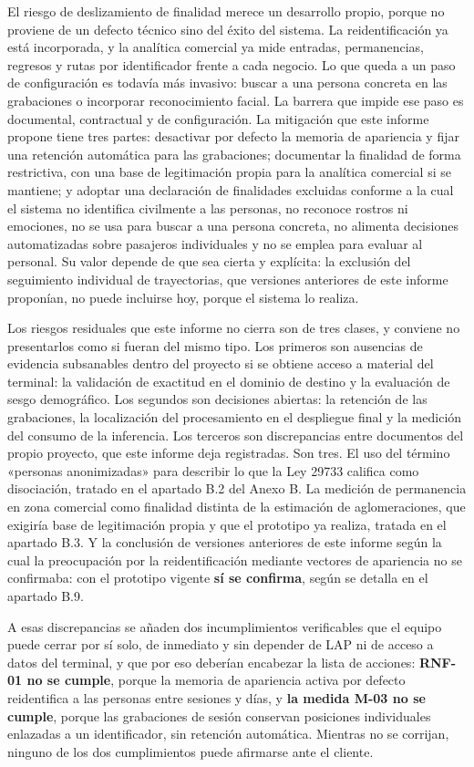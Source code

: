 El riesgo de deslizamiento de finalidad merece un desarrollo propio, porque no
proviene de un defecto técnico sino del éxito del sistema. La reidentificación
ya está incorporada, y la analítica comercial ya mide entradas, permanencias,
regresos y rutas por identificador frente a cada negocio. Lo que queda a un
paso de configuración es todavía más invasivo: buscar a una persona concreta en
las grabaciones o incorporar reconocimiento facial. La barrera que impide ese
paso es documental, contractual y de configuración. La mitigación que este
informe propone tiene tres partes: desactivar por defecto la memoria de
apariencia y fijar una retención automática para las grabaciones; documentar
la finalidad de forma restrictiva, con una base de legitimación propia para la
analítica comercial si se mantiene; y adoptar una declaración de finalidades
excluidas conforme a la cual el sistema no identifica civilmente a las
personas, no reconoce rostros ni emociones, no se usa para buscar a una
persona concreta, no alimenta decisiones automatizadas sobre pasajeros
individuales y no se emplea para evaluar al personal. Su valor depende de que
sea cierta y explícita: la exclusión del seguimiento individual de trayectorias,
que versiones anteriores de este informe proponían, no puede incluirse hoy,
porque el sistema lo realiza.

Los riesgos residuales que este informe no cierra son de tres clases, y
conviene no presentarlos como si fueran del mismo tipo. Los primeros son
ausencias de evidencia subsanables dentro del proyecto si se obtiene acceso a
material del terminal: la validación de exactitud en el dominio de destino y la
evaluación de sesgo demográfico. Los segundos son decisiones abiertas: la
retención de las grabaciones, la localización del procesamiento en el
despliegue final y la medición del consumo de la inferencia. Los terceros son
discrepancias entre documentos del propio proyecto, que este informe deja
registradas. Son tres. El uso del término «personas anonimizadas» para
describir lo que la Ley 29733 califica como disociación, tratado en el apartado
B.2 del Anexo B. La medición de permanencia en zona comercial como finalidad
distinta de la estimación de aglomeraciones, que exigiría base de legitimación
propia y que el prototipo ya realiza, tratada en el apartado B.3. Y la
conclusión de versiones anteriores de este informe según la cual la
preocupación por la reidentificación mediante vectores de apariencia no se
confirmaba: con el prototipo vigente \textbf{sí se confirma}, según se detalla
en el apartado B.9.

A esas discrepancias se añaden dos incumplimientos verificables que el equipo
puede cerrar por sí solo, de inmediato y sin depender de LAP ni de acceso a
datos del terminal, y que por eso deberían encabezar la lista de acciones:
\textbf{RNF-01 no se cumple}, porque la memoria de apariencia activa por defecto
reidentifica a las personas entre sesiones y días, y \textbf{la medida M-03 no se
cumple}, porque las grabaciones de sesión conservan posiciones individuales
enlazadas a un identificador, sin retención automática. Mientras no se
corrijan, ninguno de los dos cumplimientos puede afirmarse ante el cliente.
